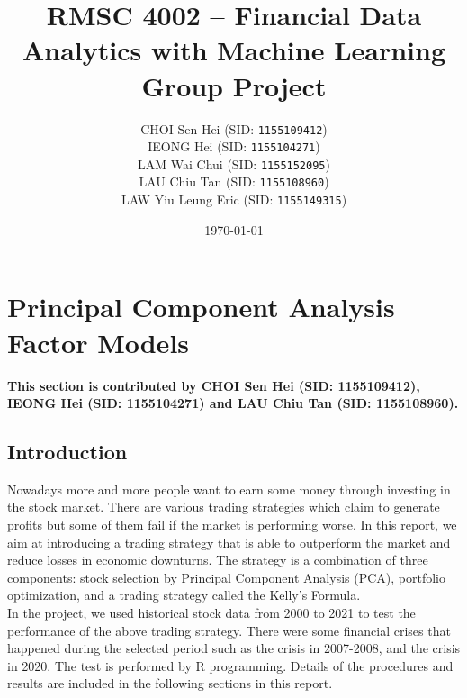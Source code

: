 \documentclass[11pt,a4paper]{article}
\begin{document}
    \thispagestyle{empty}
    \title{\textsc{RMSC 4002} -- Financial Data Analytics with Machine Learning \\ Group Project}
    \author{
        CHOI Sen Hei (SID: \texttt{1155109412}) \\
        IEONG Hei (SID: \texttt{1155104271}) \\
        LAM Wai Chui (SID: \texttt{1155152095}) \\
        LAU Chiu Tan (SID: \texttt{1155108960}) \\
        LAW Yiu Leung Eric (SID: \texttt{1155149315})
    }
    \date{\today}
    \maketitle
    
    \tableofcontents
    \thispagestyle{empty}
    \newpage
    
    
    \setcounter{page}{1}
    
    \section{Principal Component Analysis Factor Models}
    \textbf{This section is contributed by CHOI Sen Hei (SID: 1155109412), IEONG Hei (SID: 1155104271) and LAU Chiu Tan (SID: 1155108960).}
    
    \subsection{Introduction}
    Nowadays more and more people want to earn some money through investing in the stock market. There are various trading strategies which claim to generate profits but some of them fail if the market is performing worse. In this report, we aim at introducing a trading strategy that is able to outperform the market and reduce losses in economic downturns. The strategy is a combination of three components: stock selection by Principal Component Analysis (PCA), portfolio optimization, and a trading strategy called the Kelly's Formula. \\
    In the project, we used historical stock data from 2000 to 2021 to test the performance of the above trading strategy. There were some financial crises that happened during the selected period such as the crisis in 2007-2008, and the crisis in 2020. The test is performed by R programming. Details of the procedures and results are included in the following sections in this report.
    
\end{document}
